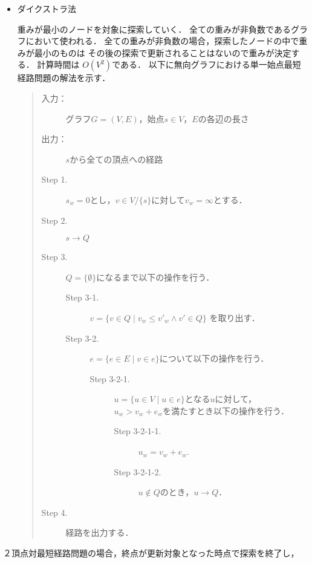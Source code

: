 \documentclass[12pt]{optlab-bachelor}
\begin{document}
\begin{itemize}
  \item ダイクストラ法

  重みが最小のノードを対象に探索していく．
  全ての重みが非負数であるグラフにおいて使われる．
  全ての重みが非負数の場合，探索したノードの中で重みが最小のものは
  その後の探索で更新されることはないので重みが決定する．
  計算時間は $O(V^2)$である．
  以下に無向グラフにおける単一始点最短経路問題の解法を示す．

  \begin{quote}
    \begin{description}
      \item[入力：] グラフ$G=(V,E)$，始点$s \in V$，$E$の各辺の長さ
      \item[出力：] $s$から全ての頂点への経路
      \item[Step 1.] $s_w = 0$とし，$v \in V/\{s\}$に対して$v_w = \infty$とする．
      \item[Step 2.] $s \rightarrow Q$
      \item[Step 3.] $Q = \{\emptyset\}$になるまで以下の操作を行う．
      \begin{description}
        \item[Step 3-1.] $v = \{ v \in Q \mid v_w \leq v'_w \land v' \in Q \}$
        を取り出す．
        \item[Step 3-2.] $e = \{ e \in E \mid v \in e \}$について以下の操作を行う．

        \begin{description}
          \item[Step 3-2-1.] $u = \{ u \in V \mid u \in e\}$となる$u$に対して，
          $u_w > v_w + e_w$を満たすとき以下の操作を行う．

          \begin{description}
            \item[Step 3-2-1-1.] $u_w = v_w + e_w$.
            \item[Step 3-2-1-2.] $u \notin Q$のとき，$u \rightarrow Q$．
          \end{description}
        \end{description}
      \end{description}

      \item[Step 4.] 経路を出力する．
    \end{description}
  \end{quote}
\end{itemize}
２頂点対最短経路問題の場合，終点が更新対象となった時点で探索を終了し，
\end{document}
